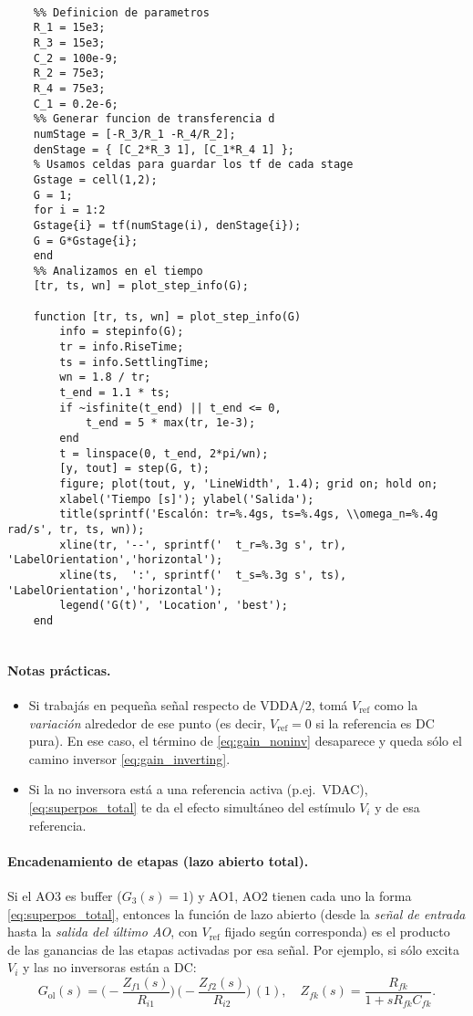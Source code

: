 \begin{lstlisting}[style=matlabstyle,caption={Script en Matlab},label={lst:mat}]
	
	%% Definicion de parametros
	R_1 = 15e3;
	R_3 = 15e3;
	C_2 = 100e-9;
	R_2 = 75e3;
	R_4 = 75e3;
	C_1 = 0.2e-6;
	%% Generar funcion de transferencia d
	numStage = [-R_3/R_1 -R_4/R_2];
	denStage = { [C_2*R_3 1], [C_1*R_4 1] };
	% Usamos celdas para guardar los tf de cada stage
	Gstage = cell(1,2);
	G = 1;
	for i = 1:2
	Gstage{i} = tf(numStage(i), denStage{i});
	G = G*Gstage{i};
	end
	%% Analizamos en el tiempo
	[tr, ts, wn] = plot_step_info(G);
	
	function [tr, ts, wn] = plot_step_info(G)
		info = stepinfo(G);
		tr = info.RiseTime;
		ts = info.SettlingTime;
		wn = 1.8 / tr;
		t_end = 1.1 * ts;
		if ~isfinite(t_end) || t_end <= 0, 
			t_end = 5 * max(tr, 1e-3); 
		end
		t = linspace(0, t_end, 2*pi/wn);
		[y, tout] = step(G, t);
		figure; plot(tout, y, 'LineWidth', 1.4); grid on; hold on;
		xlabel('Tiempo [s]'); ylabel('Salida');
		title(sprintf('Escalón: tr=%.4gs, ts=%.4gs, \\omega_n=%.4g rad/s', tr, ts, wn));
		xline(tr, '--', sprintf('  t_r=%.3g s', tr), 'LabelOrientation','horizontal');
		xline(ts,  ':', sprintf('  t_s=%.3g s', ts), 'LabelOrientation','horizontal');
		legend('G(t)', 'Location', 'best');
	end
	
\end{lstlisting}
\twocolumn

\paragraph{Notas prácticas.}
\begin{itemize}
	\item Si trabajás en pequeña señal respecto de $\text{VDDA}/2$, tomá $V_{\text{ref}}$ como la \emph{variación} alrededor de ese punto (es decir, $V_{\text{ref}}=0$ si la referencia es DC pura). En ese caso, el término de \eqref{eq:gain_noninv} desaparece y queda sólo el camino inversor \eqref{eq:gain_inverting}.
	\item Si la no inversora está a una referencia activa (p.ej.\ VDAC), \eqref{eq:superpos_total} te da el efecto simultáneo del estímulo $V_i$ y de esa referencia.
\end{itemize}

\paragraph{Encadenamiento de etapas (lazo abierto total).}
Si el AO3 es buffer ($G_3(s)=1$) y AO1, AO2 tienen cada uno la forma \eqref{eq:superpos_total}, entonces la función de lazo abierto (desde la \emph{señal de entrada} hasta la \emph{salida del último AO}, con $V_{\text{ref}}$ fijado según corresponda) es el producto de las ganancias de las etapas activadas por esa señal. Por ejemplo, si sólo excita $V_i$ y las no inversoras están a DC:
\[
G_{\text{ol}}(s)
= \Big(-\frac{Z_{f1}(s)}{R_{i1}}\Big)\,
\Big(-\frac{Z_{f2}(s)}{R_{i2}}\Big)\,
(1),
\quad
Z_{fk}(s)=\frac{R_{fk}}{1+sR_{fk}C_{fk}}.
\]
